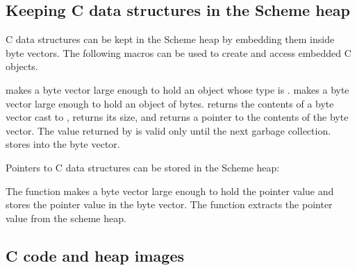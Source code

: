 \subsection{Keeping C data structures in the Scheme heap}
\label{sec:external-data}

C data structures can be kept in the Scheme heap by embedding them
 inside byte vectors.
The following macros can be used to create and access embedded C objects.

\begin{protos}
\end{protos}

\noindent{}
 makes a byte vector large enough to hold an object
whose type is .
 makes a byte vector large enough to hold an object
of  bytes.
 returns the contents of a byte vector cast to
 ,  returns its size,
and  returns a pointer to the
contents of the byte vector.
The value returned by  is valid only until
the next garbage collection.
 stores  into the byte vector.

Pointers to C data structures can be stored in the Scheme heap:

\begin{protos}
\end{protos}

\noindent{}The function  makes a byte
vector large enough to hold the pointer value and stores the pointer
value in the byte vector.  The function
 extracts the pointer value from the
scheme heap.

\subsection{C code and heap images}
\label{sec:hibernation}

